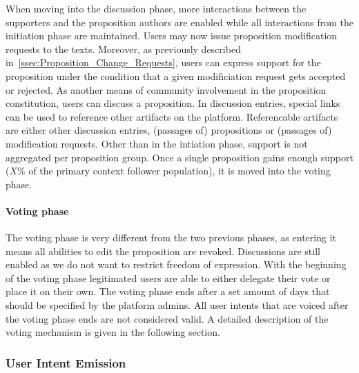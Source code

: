 When moving into the discussion phase, more interactions between the supporters and the proposition authors are enabled while all interactions from the initiation phase are maintained.
Users may now issue proposition modification requests to the texts.
Moreover, as previously described in~\ref{ssec:Proposition_Change_Requests}, users can express support for the proposition under the condition that a given modificiation request gets accepted or rejected.
As another means of community involvement in the proposition constitution, users can discuss a proposition.
In discussion entries, special links can be used to reference other artifacts on the platform.
Referencable artifacts are either other discussion entries, (passages of) propositions or (passages of) modification requests.
Other than in the intiation phase, support is not aggregated per proposition group.
Once a single proposition gains enough support ($X\%$ of the primary context follower population), it is moved into the voting phase.

\paragraph{Voting phase}
\label{ssec:Lifecycle_Voting}
The voting phase is very different from the two previous phases, as entering it means all abilities to edit the proposition are revoked.
Discussions are still enabled as we do not want to restrict freedom of expression.
With the beginning of the voting phase legitimated users are able to either delegate their vote or place it on their own.
The voting phase ends after a set amount of days that should be specified by the platform admins.
All user intents that are voiced after the voting phase ends are not considered valid.
A detailed description of the voting mechanism is given in the following section.

\subsubsection{User Intent Emission}
\label{sec:User_Intent_Emission}



